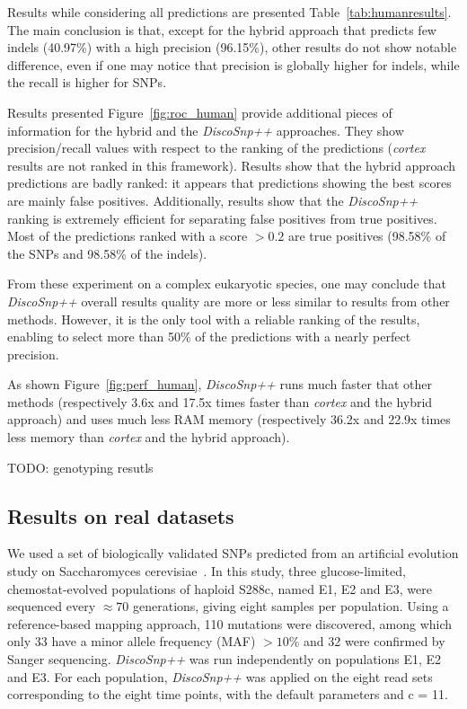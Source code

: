\documentclass{bmcart}
\newcommand{\discopp}{{\it DiscoSnp++}\xspace}
\newcommand{\co}{{\it cortex}\xspace}
\begin{document}
Results while considering all predictions are presented Table~\ref{tab:humanresults}. 
The main conclusion is that, except for the hybrid approach that predicts few indels (40.97\%) with a high precision (96.15\%), other results do not show  notable difference, even if one may notice that precision is globally higher for indels, while the recall is higher for SNPs. 

Results presented Figure~\ref{fig:roc_human} provide additional pieces of information for the hybrid and the \discopp approaches. They show precision/recall values with respect to the ranking of the predictions (\co results are not ranked in this framework). Results show that the hybrid approach predictions are badly ranked: it appears that predictions showing the best scores are mainly false positives. Additionally, results show that the \discopp ranking is extremely efficient for separating false positives from true positives. Most of the predictions ranked with a score $>0.2$ are true positives (98.58\%  of the SNPs and 98.58\% of the indels). 

From these experiment on a complex eukaryotic species, one may conclude that \discopp overall results quality are more or less similar to results from other methods. However, it is the only tool with a reliable ranking of the results, enabling to select more than 50\% of the predictions with a nearly perfect precision.

As shown Figure~\ref{fig:perf_human}, \discopp runs much faster that other methods (respectively 3.6x and 17.5x times faster than \co and the hybrid approach) and uses much less RAM memory (respectively 36.2x and 22.9x times less memory than \co and the hybrid approach). 



TODO: genotyping resutls

\subsection*{Results on real datasets}
We used a set of biologically validated SNPs predicted from an artificial evolution study on Saccharomyces cerevisiae~\cite{Kvitek2013}. 
In this study, three glucose-limited, chemostat-evolved populations of haploid S288c, named
E1, E2 and E3, were sequenced every $\approx70$ generations, giving eight samples per population. Using a reference-based mapping approach, 110 mutations were discovered, among which only 33 have a minor allele frequency (MAF) $>10\%$ and 32 were confirmed by Sanger sequencing.  \discopp was run independently on populations E1, E2 and E3. For each population, \discopp was applied on the eight read sets corresponding to the eight time points, with the default parameters and c = 11. 
\end{document}
